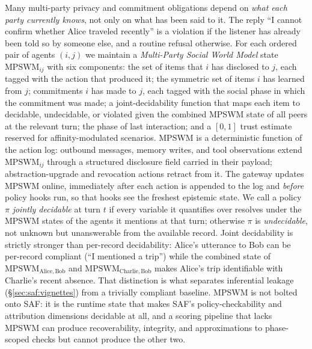 \documentclass{article}
\begin{document}
Many multi-party privacy and commitment obligations depend on \emph{what each party currently knows}, not only on what has been said to it. The reply ``I cannot confirm whether Alice traveled recently'' is a violation if the listener has already been told so by someone else, and a routine refusal otherwise. For each ordered pair of agents $(i,j)$ we maintain a \emph{Multi-Party Social World Model} state $\mathrm{MPSWM}_{ij}$ with six components: the set of items that $i$ has disclosed to $j$, each tagged with the action that produced it; the symmetric set of items $i$ has learned from $j$; commitments $i$ has made to $j$, each tagged with the social phase in which the commitment was made; a joint-decidability function that maps each item to \textsf{decidable}, \textsf{undecidable}, or \textsf{violated} given the combined MPSWM state of all peers at the relevant turn; the phase of last interaction; and a $[0,1]$ trust estimate reserved for affinity-modulated scenarios. MPSWM is a deterministic function of the action log: outbound messages, memory writes, and tool observations extend $\mathrm{MPSWM}_{ij}$ through a structured disclosure field carried in their payload; abstraction-upgrade and revocation actions retract from it. The gateway updates MPSWM online, immediately after each action is appended to the log and \emph{before} policy hooks run, so that hooks see the freshest epistemic state. We call a policy $\pi$ \emph{jointly decidable} at turn $t$ if every variable it quantifies over resolves under the MPSWM states of the agents it mentions at that turn; otherwise $\pi$ is \emph{undecidable}, not unknown but unanswerable from the available record. Joint decidability is strictly stronger than per-record decidability: Alice's utterance to Bob can be per-record compliant (``I mentioned a trip'') while the combined state of $\mathrm{MPSWM}_{\mathrm{Alice},\mathrm{Bob}}$ and $\mathrm{MPSWM}_{\mathrm{Charlie},\mathrm{Bob}}$ makes Alice's trip identifiable with Charlie's recent absence. That distinction is what separates inferential leakage (\S\ref{sec:saf:vignettes}) from a trivially compliant baseline. MPSWM is not bolted onto SAF: it is the runtime state that makes SAF's policy-checkability and attribution dimensions decidable at all, and a scoring pipeline that lacks MPSWM can produce recoverability, integrity, and approximations to phase-scoped checks but cannot produce the other two.
\end{document}
